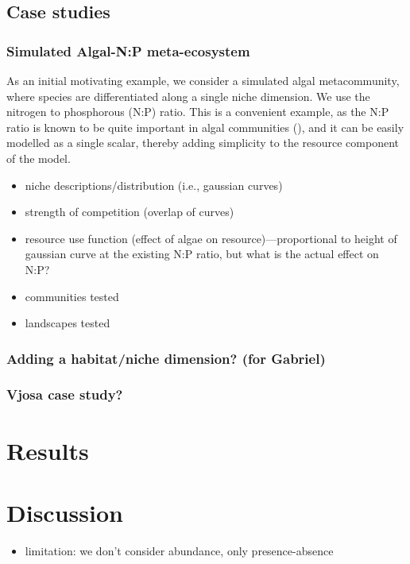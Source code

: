 \documentclass[11pt,a4paper]{article}
\begin{document}
\subsection{Case studies}

\subsubsection{Simulated Algal-N:P meta-ecosystem}
As an initial motivating example, we consider a simulated algal metacommunity, where species are differentiated along a single niche dimension.
We use the nitrogen to phosphorous (N:P) ratio.
This is a convenient example, as the N:P ratio is known to be quite important in algal communities (), and it can be easily modelled as a single scalar, thereby adding simplicity to the resource component of the model.	

\begin{itemize}
	\item niche descriptions/distribution (i.e., gaussian curves)
	\item strength of competition (overlap of curves)
	\item resource use function (effect of algae on resource)---proportional to height of gaussian curve at the existing N:P ratio, but what is the actual effect on N:P?
	\item communities tested
	\item landscapes tested 
\end{itemize}

\subsubsection{Adding a habitat/niche dimension? (for Gabriel)}

\subsubsection{Vjosa case study?}

\section{Results}

\section{Discussion}

\begin{itemize}
	\item limitation: we don't consider abundance, only presence-absence
\end{itemize}

\printbibliography
\end{document}
